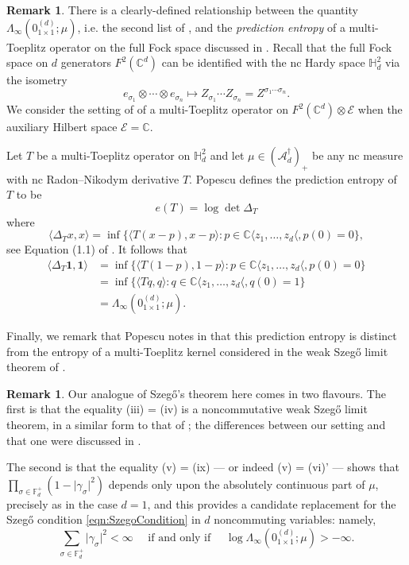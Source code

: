 \documentclass[11pt,reqno]{amsart}
\newcommand\ncm[1]{(\mathscr{A}_{#1}^{\dagger})_+}
\def\g{\gamma}
\def\s{\sigma}
\def\D{\Delta}
\def\L{\Lambda}
\def\CC{\mathbb{C}}
\def\FF{\mathbb{F}}
\def\HH{\mathbb{H}}
\theoremstyle{definition}
\newtheorem{remark}[theorem]{Remark}
\numberwithin{equation}{section}
\begin{document}
\begin{remark}
    \label{rem:Popescu06}
    There is a clearly-defined relationship between the quantity \(\L_{\infty}(0_{1\times1}^{(d)}; \mu)\), i.e. the second list of , and the \emph{prediction entropy} of a multi-Toeplitz operator on the full Fock space discussed in \cite{Pop06}. Recall that the full Fock space on \(d\) generators \(F^2(\CC^d)\) can be identified with the nc Hardy space \(\HH^2_d\) via the isometry
    \[
        e_{\s_1} \otimes \cdots \otimes e_{\s_n} \mapsto Z_{\s_1} \cdots Z_{\s_n} = Z^{\s_1 \cdots \s_n}.
    \]
    We consider the setting of \cite{Pop06} of a multi-Toeplitz operator on \(F^2(\CC^d) \otimes \mathcal{E}\) when the auxiliary Hilbert space \(\mathcal{E} = \CC\).
    
    Let \(T\) be a multi-Toeplitz operator on \(\HH_d^2\) and let \(\mu \in \ncm{d}\) be any nc measure with nc Radon--Nikodym derivative \(T\). Popescu \cite{Pop06} defines the prediction entropy of \(T\) to be 
    \[
        e(T) = \log \det \Delta_T
    \]
    where
    \[
        \langle \Delta_T x, x\rangle = \inf\{\langle T(x-p), x-p \rangle : p \in \CC \langle z_1, \ldots, z_d \langle, p(0) = 0\},
    \]
    see Equation (1.1) of \cite{Pop06}.
    It follows that
    \begin{align*}
        \langle \D_T \mathbf{1}, \mathbf{1} \rangle & = \inf\{\langle T(1-p), 1-p \rangle : p \in \CC \langle z_1, \ldots, z_d \langle, p(0) = 0\} \\ 
        & = \inf\{\langle Tq, q \rangle : q \in \CC \langle z_1, \ldots, z_d \langle, q(0) = 1\} \\
        & = \L_{\infty}(0_{1\times1}^{(d)}; \mu).
    \end{align*}

    Finally, we remark that Popescu notes in \cite{Pop06} that this prediction entropy is distinct from the entropy of a multi-Toeplitz kernel considered in the weak Szeg\H{o} limit theorem of \cite{Pop01}.
\end{remark}

\begin{remark}
    Our analogue of Szeg\H{o}'s theorem here comes in two flavours. The first is that the equality (iii) = (iv) is a noncommutative weak Szeg\H{o} limit theorem, in a similar form to that of \cite{Pop01}; the differences between our setting and that one were discussed in .

    The second is that the equality (v) = (ix) --- or indeed (v) = (vi)' --- shows that \(\prod_{\s \in \FF_d^+} (1 - \lvert \g_\s \rvert^2)\) depends only upon the absolutely continuous part of \(\mu\), precisely as in the case \(d = 1\), and this provides a candidate replacement for the Szeg\H{o} condition \eqref{eqn:SzegoCondition} in \(d\) noncommuting variables: namely,
    \[
        \sum_{\s \in \FF_d^+} \lvert \g_\s \rvert^2 < \infty \quad \text{ if and only if } \quad \log \L_{\infty}(0^{(d)}_{1 \times 1}; \mu) > - \infty.
    \]
\end{remark}
\end{document}
